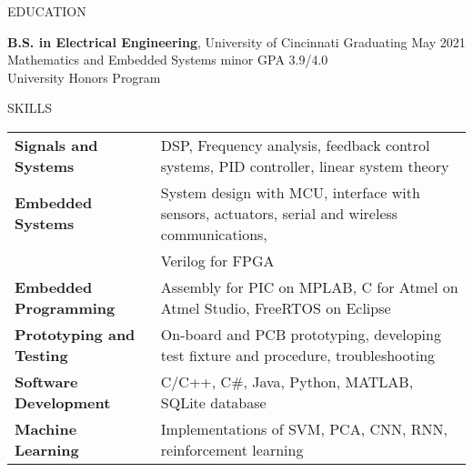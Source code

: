 \documentclass{resume} %
\begin{document}
	


	
	\begin{rSection}{EDUCATION}
		
		{\bf B.S. in Electrical Engineering}, University of Cincinnati \hfill {Graduating May 2021}\\
		Mathematics and Embedded Systems minor \hfill {GPA 3.9/4.0}\\
		University Honors Program
		
		
		
	\end{rSection}
	
	\begin{rSection}{SKILLS}
		
		\begin{tabular}{ @{} >{\bfseries}l @{\hspace{2ex}} l }
			Signals and Systems & DSP, Frequency analysis, feedback control systems, PID controller, linear system theory	\\
			Embedded Systems & System design with MCU, interface with sensors, actuators, serial and wireless communications, \\ 
			 & Verilog for FPGA	\\
			Embedded Programming & Assembly for PIC on MPLAB, C for Atmel on Atmel Studio, FreeRTOS on Eclipse \\
			Prototyping and Testing &  On-board and PCB prototyping, developing test fixture and procedure, troubleshooting	\\
			Software Development & C/C++, C\#, Java, Python, MATLAB, SQLite database \\
			Machine Learning & Implementations of  SVM, PCA, CNN, RNN, reinforcement learning
		\end{tabular}
	\end{rSection}
	
\end{document}
